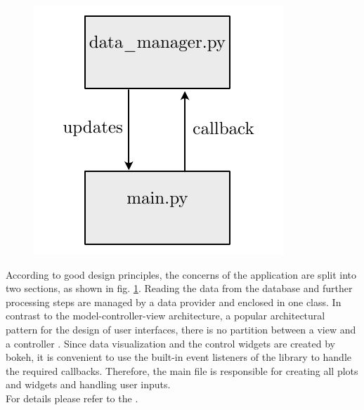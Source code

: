     \begin{figure}[h]
    \capstart
        \centering
    	\includegraphics{Abbildung/vis_architecture.pdf}

    	\begin{minipage}{\captionwidth}
    		\caption[vis archi]{}
    		\label{fig:plot_architecture}
    	\end{minipage}
    \end{figure}

According to good design principles, the concerns of the application are split into two sections, as shown in fig. \ref{fig:plot_architecture}. Reading the data from the database and further processing steps are managed by a data provider and enclosed in one class. In contrast to the model-controller-view architecture, a popular architectural pattern for the design of user interfaces, there is no partition between a view and a controller \cite{langtangenUsingWebFrameworks2015}. Since data visualization and the control widgets are created by bokeh, it is convenient to use the built-in event listeners of the library to handle the required callbacks. Therefore, the main file is responsible for creating all plots and widgets and handling user inputs.\\
For details please refer to the .

